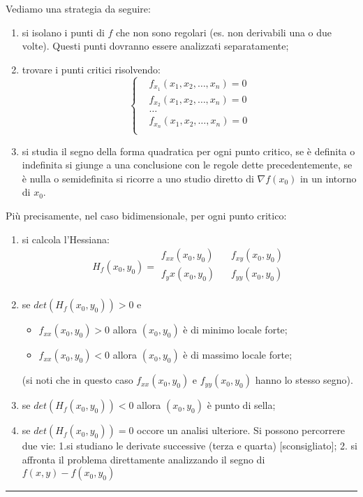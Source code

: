\begin{tcolorbox}
Vediamo una strategia da seguire:
\begin{enumerate}
    \item si isolano i punti di $f$ che non sono regolari (es. non derivabili una o due volte). Questi punti dovranno essere analizzati separatamente;
    \item trovare i punti critici risolvendo:
        \[
            \begin{cases}
                &f_{x_1}(x_1,x_2,\dots,x_n) = 0\\
                &f_{x_2}(x_1,x_2,\dots,x_n) = 0\\
                &\dots\\
                &f_{x_n}(x_1,x_2,\dots,x_n) = 0\\
            \end{cases}
        \]
    \item si studia il segno della forma quadratica per ogni punto critico, se è definita o indefinita si giunge a una conclusione con le regole dette precedentemente, se è nulla o semidefinita si ricorre a uno studio diretto di $\nabla f(x_0)$ in un intorno di $x_0$.
\end{enumerate}
Più precisamente, nel caso bidimensionale, per ogni punto critico:
\begin{enumerate}
    \item si calcola l'Hessiana:
        \[
            H_f(x_0, y_0) = \begin{matrix}
                f_{xx}(x_0,y_0) \;\;\; & f_{xy}(x_0,y_0)\\
                f_yx(x_0,y_0) \;\;\; & f_{yy}(x_0,y_0)\\
            \end{matrix}
        \]
    \item se $det(H_f(x_0, y_0)) > 0$ e
        \begin{itemize}
            \item $f_{xx}(x_0,y_0)>0$ allora $(x_0, y_0)$ è di minimo locale forte;
            \item $f_{xx}(x_0,y_0)<0$ allora $(x_0, y_0)$ è di massimo locale forte;
        \end{itemize}
        (si noti che in questo caso $f_{xx}(x_0,y_0)$ e $f_{yy}(x_0,y_0)$ hanno lo stesso segno).
    \item se $det(H_f(x_0, y_0)) < 0$ allora $(x_0, y_0)$ è punto di sella;
    \item se $det(H_f(x_0, y_0)) = 0$ occore un analisi ulteriore. Si possono percorrere due vie: 1.si studiano le derivate successive (terza e quarta) [sconsigliato]; 2. si affronta il problema direttamente analizzando il segno di $f(x,y) - f(x_0, y_0)$
\end{enumerate}
\end{tcolorbox}
\rule{\textwidth}{2pt}
